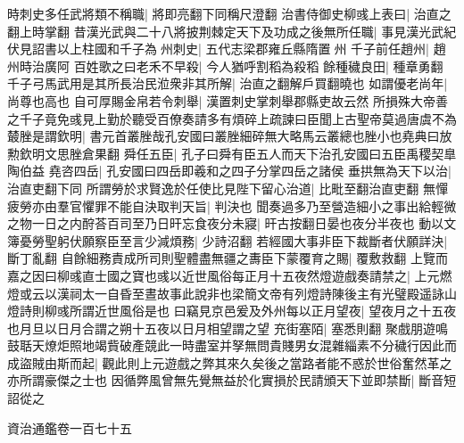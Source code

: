 時刺史多任武將類不稱職|{
	將即亮翻下同稱尺澄翻}
治書侍御史柳彧上表曰|{
	治直之翻上時掌翻}
昔漢光武與二十八將披荆棘定天下及功成之後無所任職|{
	事見漢光武紀}
伏見詔書以上柱國和千子為州刺史|{
	五代志梁郡雍丘縣隋置州}
千子前任趙州|{
	趙州時治廣阿}
百姓歌之曰老禾不早殺|{
	今人猶呼割稻為殺稻}
餘種穢良田|{
	種章勇翻}
千子弓馬武用是其所長治民涖衆非其所解|{
	治直之翻解戶買翻曉也}
如謂優老尚年|{
	尚尊也高也}
自可厚賜金帛若令刺舉|{
	漢置刺史掌刺舉郡縣吏故云然}
所損殊大帝善之千子竟免彧見上勤於聽受百僚奏請多有煩碎上疏諫曰臣聞上古聖帝莫過唐虞不為樷脞是謂欽明|{
	書元首叢脞哉孔安國曰叢脞細碎無大略馬云叢總也脞小也堯典曰放勲欽明文思脞倉果翻}
舜任五臣|{
	孔子曰舜有臣五人而天下治孔安國曰五臣禹稷契臯陶伯益}
堯咨四岳|{
	孔安國曰四岳即羲和之四子分掌四岳之諸侯}
垂拱無為天下以治|{
	治直吏翻下同}
所謂勞於求賢逸於任使比見陛下留心治道|{
	比毗至翻治直吏翻}
無憚疲勞亦由羣官懼罪不能自決取判天旨|{
	判決也}
聞奏過多乃至營造細小之事出給輕微之物一日之内酧荅百司至乃日旰忘食夜分未寢|{
	旰古按翻日晏也夜分半夜也}
動以文簿憂勞聖躬伏願察臣至言少減煩務|{
	少詩沼翻}
若經國大事非臣下裁斷者伏願詳決|{
	斷丁亂翻}
自餘細務責成所司則聖體盡無疆之夀臣下蒙覆育之賜|{
	覆敷救翻}
上覽而嘉之因曰柳彧直士國之寶也彧以近世風俗每正月十五夜然燈遊戲奏請禁之|{
	上元燃燈或云以漢祠太一自昏至晝故事此說非也梁簡文帝有列燈詩陳後主有光璧殿遥詠山燈詩則柳彧所謂近世風俗是也}
曰竊見京邑爰及外州每以正月望夜|{
	望夜月之十五夜也月旦以日月合謂之朔十五夜以日月相望謂之望}
充街塞陌|{
	塞悉則翻}
聚戲朋遊鳴鼓聒天燎炬照地竭貲破產競此一時盡室并孥無問貴賤男女混雜緇素不分穢行因此而成盜賊由斯而起|{
	觀此則上元遊戲之弊其來久矣後之當路者能不惑於世俗奮然革之亦所謂豪傑之士也}
因循弊風曾無先覺無益於化實損於民請頒天下並即禁斷|{
	斷音短}
詔從之

資治通鑑卷一百七十五
